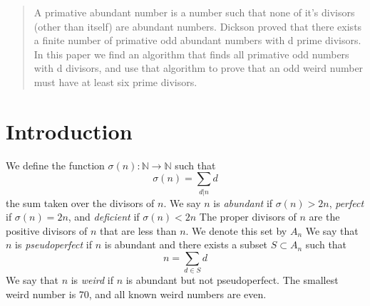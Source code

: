 \documentclass[../paper.tex]{article}
\begin{document}
\begin{abstract}
A primative abundant number is a number such that none of it's 
divisors (other than itself) are abundant numbers. Dickson proved
that there exists a finite number of primative odd abundant 
numbers with d prime divisors. In this paper we find an algorithm 
that finds all primative odd numbers with d divisors, and use that
algorithm to prove that an odd weird number must have at least six 
prime divisors.

\end{abstract}

\section{Introduction}
We define the function 
%
$\sigma(n):\mathbb{N} \rightarrow \mathbb{N}$
%
such that
%
$$\sigma(n) = \sum_{d|n}d$$
%
the sum taken over the divisors of $n$. We say $n$ is 
\textit{abundant} if $\sigma(n) > 2n$, \textit{perfect} if 
$\sigma(n) = 2n$, and \textit{deficient} if $\sigma(n) < 2n$ The 
proper divisors of $n$ are the positive divisors of $n$ that are
less than $n$. We denote this set by $\textit{A}_{n}$
%
We say that $n$ is \textit{pseudoperfect} if $n$ is abundant and
there exists a subset $S \subset \textit{A}_{n} $ such that
%
$$ n = \sum_{d \in S} d$$
%
We say that $n$ is \textit{weird} if $n$ is abundant but not 
pseudoperfect. The smallest weird number is 70, and all known 
weird numbers are even.
\end{document}
